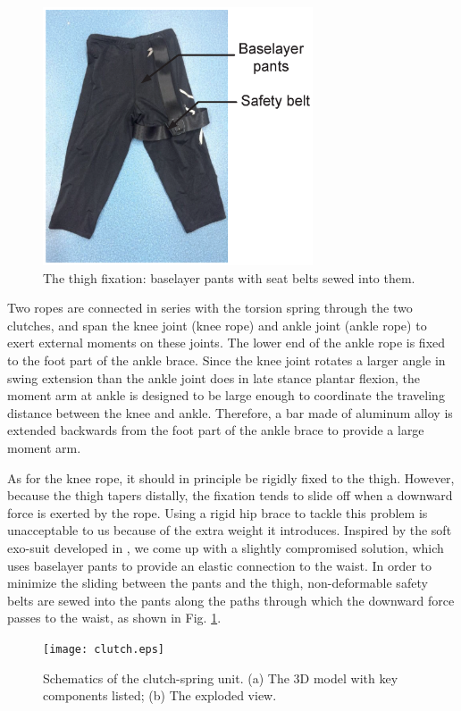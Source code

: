 \documentclass[10pt]{asme2ej}
\begin{document}
\begin{figure}[b]
	\centering
	\includegraphics[width=8cm]{Figure3.eps}
	\caption{The thigh fixation: baselayer pants with seat belts sewed into them.}
	\label{fig:pants}   
\end{figure}

Two ropes are connected in series with the torsion spring through the two clutches, and span the knee joint (knee rope) and ankle joint (ankle rope) to exert external moments on these joints.
The lower end of the ankle rope is fixed to the foot part of the ankle brace.
Since the knee joint rotates a larger angle in swing extension than the ankle joint does in late stance plantar flexion, the moment arm at ankle is designed to be large enough to coordinate the traveling distance between the knee and ankle.
Therefore, a bar made of aluminum alloy is extended backwards from the foot part of the ankle brace to provide a large moment arm.

As for the knee rope, it should in principle be rigidly fixed to the thigh.
However, because the thigh tapers distally, the fixation tends to slide off when a downward force is exerted by the rope.
Using a rigid hip brace to tackle this problem is unacceptable to us because of the extra weight it introduces.
Inspired by the soft exo-suit developed in \cite{RN20}, we come up with a slightly compromised solution, which uses baselayer pants to provide an elastic connection to the waist.
In order to minimize the sliding between the pants and the thigh, non-deformable safety belts are sewed into the pants along the paths through which the downward force passes to the waist, as shown in Fig. \ref{fig:pants}.

\begin{figure}[t]
	\centering
	\texttt{[image: clutch.eps]}
	\caption{Schematics of the clutch-spring unit. (a) The 3D model with key components listed; (b) The exploded view.}
	\label{fig:clutch}   
\end{figure}
\end{document}

